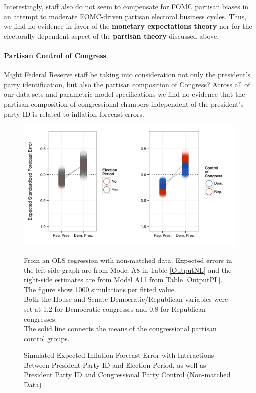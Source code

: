 \documentclass[a4paper]{article}\usepackage{graphicx, color}
\newenvironment{knitrout}{}{} %
\begin{document}
Interestingly, staff also do not seem to compensate for FOMC partisan biases in an attempt to moderate FOMC-driven partisan electoral business cycles. Thus, we find no evidence in favor of the {\bf{monetary expectations theory}} nor for the electorally dependent aspect of the {\bf{partisan theory}} discussed above.

\paragraph{Partisan Control of Congress}

Might Federal Reserve staff be taking into consideration not only the president's party identification, but also the partisan composition of Congress?  Across all of our data sets and parametric model specifications we find no evidence that the partisan composition of congressional chambers independent of the president's party ID is related to inflation forecast errors. 

\begin{figure}[t]
    \caption{Simulated Expected Inflation Forecast Error with Interactions Between President Party ID and Election Period, as well as President Party ID and Congressional Party Control (Non-matched Data)}
    \label{InterPlot}
    \begin{center}

\begin{knitrout}
\color{fgcolor}\includegraphics[width=0.95\linewidth]{figure/InterPlot} 
\end{knitrout}


    \end{center}
    \begin{singlespace}
        {\scriptsize{From an OLS regression with non-matched data. Expected errors in the left-side graph are from Model A8 in Table \ref{OutputNL} and the right-side estimates are from Model A11 from Table \ref{OutputPL}. The figure show 1000 simulations per fitted value. \\ Both the House and Senate Democratic/Republican variables were set at 1.2 for Democratic congresses and 0.8 for Republican congresses. \\ The solid line connects the means of the congressional partisan control groups.}}
    \end{singlespace}
\end{figure}
\end{document}
